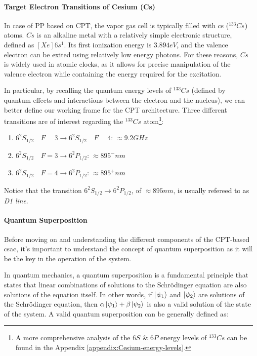 \paragraph{Target Electron Transitions of Cesium (Cs)}

In case of PP based on CPT, the vapor gas cell is typically filled with \acrfull{cs} ($^{133}Cs$) atoms.
$Cs$ is an alkaline metal with a relatively simple electronic structure, defined as $[Xe]6s^1$.
Its first ionization energy is $3.894 eV$, and the valence electron can be exited using relatively low energy photons.
For these reasons, $Cs$ is widely used in atomic clocks, as it allows for precise manipulation of the valence electron while containing the energy required for the excitation.

In particular, by recalling the quantum energy levels of $^{133}Cs$ (defined by quantum effects and interactions between the electron and the nucleus), we can better define our working frame for the CPT architecture.
Three different transitions are of interest regarding the $^{133}Cs$ atom\footnote{A more comprehensive analysis of the $6S$ \& $6P$ energy levels of $^{133}Cs$ can be found in the Appendix \ref{appendix:Cesium-energy-levels}.}:

\begin{enumerate}[label = Cs.\Roman*, ref = Cs.\Roman*, leftmargin = *]
    \item \label{itm:Cs-I} $6^2S_{1/2} \quad F=3 \rightarrow 6^2S_{1/2} \quad F=4$: $\approx 9.2GHz$
    \item \label{itm:Cs-II} $6^2S_{1/2} \quad F=3 \rightarrow 6^2P_{1/2}$: $\approx 895^{-}nm$
    \item \label{itm:Cs-III} $6^2S_{1/2} \quad F=4 \rightarrow 6^2P_{1/2}$: $\approx 895^{+}nm$
\end{enumerate}

Notice that the transition $6^2S_{1/2} \rightarrow 6^2P_{1/2}$, of $\approx 895nm$, is usually refereed to as \textit{D1 line}.


\paragraph{Quantum Superposition}

Before moving on and understanding the different components of the CPT-based \acrshort{csac}, it's important to understand the concept of quantum superposition as it will be the key in the operation of the system.

In quantum mechanics, a quantum superposition is a fundamental principle that states that linear combinations of solutions to the Schr\"{o}dinger equation are also solutions of the equation itself.
In other words, if $\ket{\psi_1}$ and $\ket{\psi_2}$ are solutions of the Schr\"{o}dinger equation, then $\alpha\ket{\psi_1} + \beta\ket{\psi_2}$ is also a valid solution of the state of the system.
A valid quantum superposition can be generally defined as:

